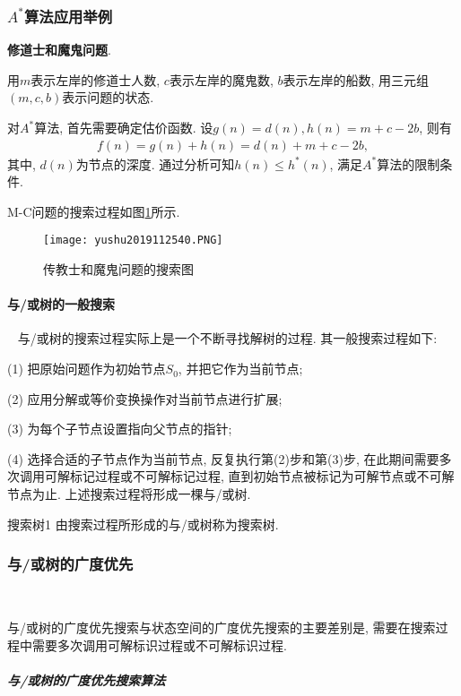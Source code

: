 \subsubsection{$A^*$算法应用举例}
\begin{example}
    \textbf{修道士和魔鬼问题}.
\end{example}
\begin{result}
用$m$表示左岸的修道士人数, $c$表示左岸的魔鬼数, $b$表示左岸的船数, 用三元组$(m, c, b)$表示问题的状态.

对$A^*$算法, 首先需要确定估价函数. 设$g(n)=d(n), h(n)=m+c-2b$, 则有
\begin{align}
    f(n)=g(n)+h(n)=d(n)+m+c-2b,
\end{align}
其中, $d(n)$为节点的深度. 通过分析可知$h(n)\leq h^*(n)$, 满足$A^*$算法的限制条件.
\end{result}

M-C问题的搜索过程如图\ref{AI32fig40}所示.
\begin{figure}[H]
\centering
\texttt{[image: yushu2019112540.PNG]}
\caption{传教士和魔鬼问题的搜索图}
\label{AI32fig40}
\end{figure}
\paragraph{与/或树的一般搜索}~{}
与/或树的搜索过程实际上是一个不断寻找解树的过程. 其一般搜索过程如下:

(1) 把原始问题作为初始节点$S_0$, 并把它作为当前节点;

(2) 应用分解或等价变换操作对当前节点进行扩展;

(3) 为每个子节点设置指向父节点的指针;

(4) 选择合适的子节点作为当前节点, 反复执行第(2)步和第(3)步, 在此期间需要多次调用可解标记过程或不可解标记过程, 直到初始节点被标记为可解节点或不可解节点为止.
上述搜索过程将形成一棵与/或树.

\begin{mydef}{搜索树}{1}
    由搜索过程所形成的与/或树称为搜索树.
\end{mydef}
\subsubsection{与/或树的广度优先}~{}

与/或树的广度优先搜索与状态空间的广度优先搜索的主要差别是, 需要在搜索过程中需要多次调用可解标识过程或不可解标识过程.
\subparagraph{与/或树的广度优先搜索算法}~{}

